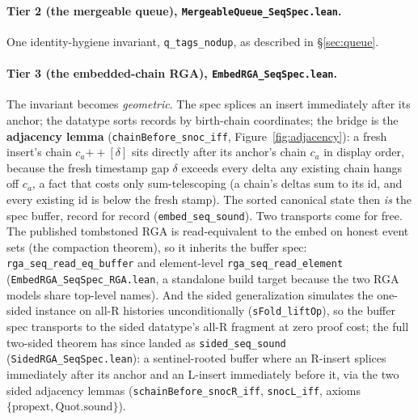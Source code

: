 \documentclass[11pt]{article}
\newcommand{\code}[1]{\texttt{#1}}
\begin{document}
\paragraph{Tier 2 (the mergeable queue),
\code{MergeableQueue\_SeqSpec.lean}.}
One identity-hygiene invariant, \code{q\_tags\_nodup}, as described in
\S\ref{sec:queue}.

\paragraph{Tier 3 (the embedded-chain RGA),
\code{EmbedRGA\_SeqSpec.lean}.}
The invariant becomes \emph{geometric}. The spec splices an insert
immediately after its anchor; the datatype sorts records by
birth-chain coordinates; the bridge is the \textbf{adjacency lemma}
(\code{chainBefore\_snoc\_iff}, Figure~\ref{fig:adjacency}): a fresh
insert's chain $c_a \mathbin{+\!\!+} [\delta]$ sits directly after its
anchor's chain $c_a$ in display order, because the fresh timestamp gap
$\delta$ exceeds every delta any existing chain hangs off $c_a$, a
fact that costs only sum-telescoping (a chain's deltas sum to its id,
and every existing id is below the fresh stamp). The sorted canonical
state then \emph{is} the spec buffer, record for record
(\code{embed\_seq\_sound}). Two transports come for free. The
published tombstoned RGA is read-equivalent to the embed on honest
event sets (the compaction theorem), so it inherits the buffer spec:
\code{rga\_seq\_read\_eq\_buffer} and element-level
\code{rga\_seq\_read\_element} (\code{EmbedRGA\_SeqSpec\_RGA.lean}, a
standalone build target because the two RGA models share top-level
names). And the sided generalization simulates the one-sided instance
on all-R histories unconditionally (\code{sFold\_liftOp}), so the
buffer spec transports to the sided datatype's all-R fragment at zero
proof cost; the full two-sided theorem has since landed as
\code{sided\_seq\_sound} (\code{SidedRGA\_SeqSpec.lean}): a
sentinel-rooted buffer where an R-insert splices immediately after its
anchor and an L-insert immediately before it, via the two sided
adjacency lemmas (\code{schainBefore\_snocR\_iff},
\code{snocL\_iff}, axioms $\{\mathrm{propext},
\mathrm{Quot.sound}\}$).
\end{document}

